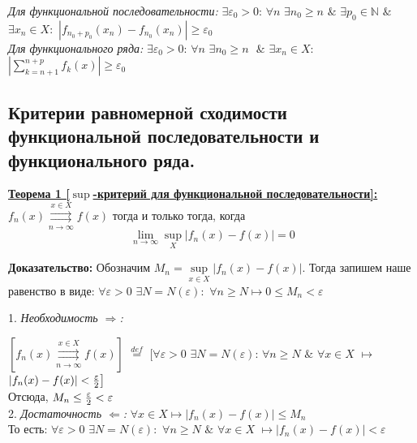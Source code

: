 \documentclass[a4paper,12pt]{article} %
\begin{document}
\textit{Для функциональной последовательности:}
\newline
$\exists \varepsilon_0 > 0$: $\forall n$ $\exists n_0 \geq n$ $\& $ $\exists  p_0 \in \mathds{N}$ $\&$ $\exists x_n \in X:$ $|f_{n_0+p_0}(x_n) - f_{n_0}(x_n)| \geq \varepsilon_0$ 
\\[5mm] 
\textit{Для функционального ряда:}
\newline
$\exists \varepsilon_0 > 0$: $\forall n$ $\exists n_0 \geq n \text{ }\& $ $\exists x_n \in X:$ $|\sum\limits_{k = n+1}^{n+p}f_k(x)| \geq \varepsilon_0$ 

\subsection{Критерии равномерной сходимости функциональной последовательности и функционального ряда.}

\underline{\textbf{Теорема 1 [$\sup$-критерий для функциональной последовательности]:}}\newline 
$f_n(x) \overset{x \in X}{\underset{n \rightarrow \infty}{\rightrightarrows}} f(x)$ тогда и только тогда, когда $$\lim\limits_{n \rightarrow \infty} \sup_{X}|f_n(x)-f(x)| = 0$$

\textbf{Доказательство:} 
\newline
Обозначим $M_n = \sup\limits_{x \in X}{|f_n(x)-f(x)|}$. \newline
Тогда запишем  наше равенство в виде: \newline
\hspace*{40mm}$\forall \varepsilon > 0$ $\exists N = N(\varepsilon):$ $\forall n \geq N \mapsto 0 \leq M_n < \varepsilon$ \newline

 1. \textit{Необходимость $\Rightarrow$:} \newline
 
 $[f_n(x) \overset{x \in X}{\underset{n \rightarrow \infty}{\rightrightarrows}} f(x)]$ $\stackrel{def}{=}$ $\big[\forall \varepsilon > 0 $  $\exists N = N(\varepsilon)$: $\forall n \geq N$  $\&$  $\forall x \in X$ $\longmapsto$ $|f_n(x) -f(x)| < {\varepsilon \over 2} \big]$
 \\[5 mm]
 Отсюда, $M_n \leq {\varepsilon \over 2 } < \varepsilon$
\\[ 5 mm]
2. \textit{Достаточность $\Leftarrow$:} \newline
\hspace*{5mm}$\forall x \in X \longmapsto |f_n(x)-f(x)|\leq M_n$ 
\\[ 5 mm]
То есть: \newline
\hspace*{20mm}$\forall \varepsilon > 0$  $\exists N = N(\varepsilon):$  $\forall n \geq N$ $\&$ $\forall x \in X$ $\longmapsto |f_n(x)-f(x)| < \varepsilon$ \newline
\end{document}
